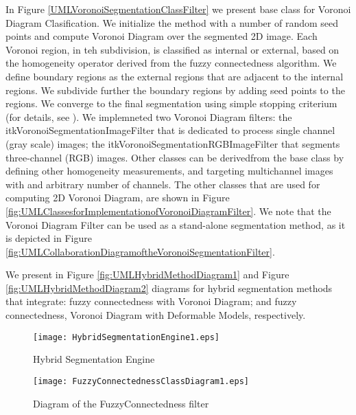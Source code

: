 In Figure \ref{UMLVoronoiSegmentationClassFilter} we present base class for
Voronoi Diagram Clasification. We initialize the method with a number of random
seed points and compute Voronoi Diagram over the segmented 2D image. Each
Voronoi region, in teh subdivision, is classified as internal or external,
based on the homogeneity operator derived from the fuzzy connectedness
algorithm.  We define boundary regions as the external regions that are
adjacent to the internal regions.  We subdivide further the boundary regions
by adding seed points to the regions. We converge to the final segmentation
using simple stopping criterium (for details, see \cite{Imielinska2001}). We
implemneted two Voronoi Diagram filters: the
itkVoronoiSegmentationImageFilter that is dedicated to process single channel
(gray scale) images; the itkVoronoiSegmentationRGBImageFilter that segments
three-channel (RGB) images. Other classes can be derivedfrom the base class
by defining other homogeneity measurements, and targeting multichannel images
with and arbitrary number of channels.  The other classes that are used for
computing 2D Voronoi Diagram, are shown in Figure
\ref{fig:UMLClassesforImplementationofVoronoiDiagramFilter}. We note that the
Voronoi Diagram Filter can be used as a stand-alone segmentation method, as
it is depicted in Figure
\ref{fig:UMLCollaborationDiagramoftheVoronoiSegmentationFilter}.

 We present in Figure \ref{fig:UMLHybridMethodDiagram1} and Figure
 \ref{fig:UMLHybridMethodDiagram2} diagrams for hybrid segmentation methods
 that integrate: fuzzy connectedness with Voronoi Diagram; and fuzzy
 connectedness, Voronoi Diagram with Deformable Models, respectively.


%
%
%

\begin{figure}
\center
\texttt{[image: HybridSegmentationEngine1.eps]}
\caption{Hybrid Segmentation Engine}
\label{fig:ComponentsofaHybridSegmentationApproach}
\end{figure}


\begin{figure}
\center
\texttt{[image: FuzzyConnectednessClassDiagram1.eps]}
\caption{Diagram of the FuzzyConnectedness filter}
\label{fig:UMLClassDiagramoftherFuzzyConnectednessFilter}
\end{figure}


